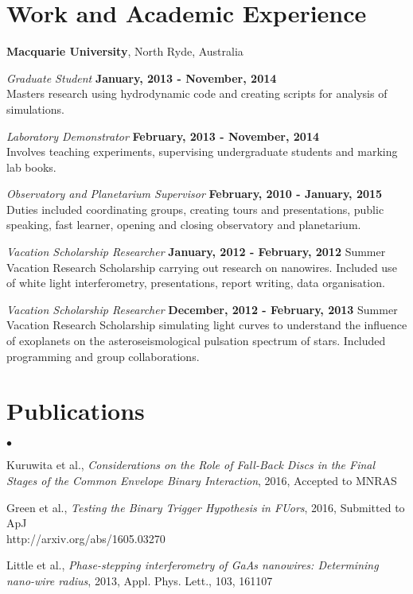 \documentclass[margin,line]{res}
\newenvironment{list2}{
  \begin{list}{$\bullet$}{%
      \setlength{\itemsep}{0in}
      \setlength{\parsep}{0in} \setlength{\parskip}{0in}
      \setlength{\topsep}{0in} \setlength{\partopsep}{0in} 
      \setlength{\leftmargin}{0.2in}}}{\end{list}}
\begin{document}
\begin{resume}
\section{\sc Work and Academic Experience}
{\bf Macquarie University}, North Ryde, Australia

\vspace{-.3cm}
{\em Graduate Student} \hfill {\bf January, 2013 - November, 2014}\\
Masters research using hydrodynamic code and creating scripts for analysis of simulations.

{\em Laboratory Demonstrator} \hfill {\bf February, 2013 - November, 2014}\\
Involves teaching experiments, supervising undergraduate students and marking lab books. 

{\em Observatory and Planetarium Supervisor} \hfill {\bf February, 2010 - January, 2015}\\
Duties included coordinating groups, creating tours and presentations, public speaking, fast learner, opening and closing observatory and planetarium.
\vspace*{.05in}

{\em Vacation Scholarship Researcher} \hfill {\bf January, 2012 - February, 2012}
Summer Vacation Research Scholarship carrying out research on nanowires. Included
use of white light interferometry, presentations, report writing, data organisation.

{\em Vacation Scholarship Researcher} \hspace{4cm} {\bf December, 2012 - February, 2013}
Summer Vacation Research Scholarship simulating light curves to understand the influence of exoplanets on the asteroseismological pulsation spectrum of stars. Included programming and group collaborations.

\section{\sc Publications}
\begin{list2}
\item Kuruwita et al., \emph{Considerations on the Role of Fall-Back Discs in the Final
Stages of the Common Envelope Binary Interaction}, 2016, Accepted to MNRAS \vspace{-0.2in}\\
\item Green et al., \emph{Testing the Binary Trigger Hypothesis in FUors}, 2016, Submitted to ApJ\\
http://arxiv.org/abs/1605.03270\\
\item Little et al., \emph{Phase-stepping interferometry of GaAs nanowires: Determining nano-wire radius}, 2013, Appl. Phys. Lett., 103, 161107\\
\end{list2}


\end{resume}
\end{document}
